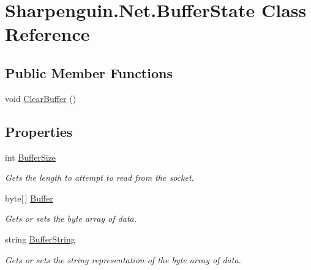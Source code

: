 \hypertarget{classSharpenguin_1_1Net_1_1BufferState}{\section{Sharpenguin.\-Net.\-Buffer\-State Class Reference}
\label{classSharpenguin_1_1Net_1_1BufferState}
}
\subsection*{Public Member Functions}
\begin{DoxyCompactItemize}
\item 
void \hyperlink{classSharpenguin_1_1Net_1_1BufferState_a73443f3d9519e6fb369c71ee6952f758}{Clear\-Buffer} ()
\end{DoxyCompactItemize}
\subsection*{Properties}
\begin{DoxyCompactItemize}
\item 
\hypertarget{classSharpenguin_1_1Net_1_1BufferState_a01424f789f95f2a2b6293cc88f76b59e}{int \hyperlink{classSharpenguin_1_1Net_1_1BufferState_a01424f789f95f2a2b6293cc88f76b59e}{Buffer\-Size}}\label{classSharpenguin_1_1Net_1_1BufferState_a01424f789f95f2a2b6293cc88f76b59e}

\begin{DoxyCompactList}\small\item\em Gets the length to attempt to read from the socket. \end{DoxyCompactList}\item 
\hypertarget{classSharpenguin_1_1Net_1_1BufferState_a9391f33e6980927dd58dc636beb9998a}{byte\mbox{[}$\,$\mbox{]} \hyperlink{classSharpenguin_1_1Net_1_1BufferState_a9391f33e6980927dd58dc636beb9998a}{Buffer}}\label{classSharpenguin_1_1Net_1_1BufferState_a9391f33e6980927dd58dc636beb9998a}

\begin{DoxyCompactList}\small\item\em Gets or sets the byte array of data. \end{DoxyCompactList}\item 
\hypertarget{classSharpenguin_1_1Net_1_1BufferState_a12b394506b5b5dc4821535e52038210c}{string \hyperlink{classSharpenguin_1_1Net_1_1BufferState_a12b394506b5b5dc4821535e52038210c}{Buffer\-String}}\label{classSharpenguin_1_1Net_1_1BufferState_a12b394506b5b5dc4821535e52038210c}

\begin{DoxyCompactList}\small\item\em Gets or sets the string representation of the byte array of data. \end{DoxyCompactList}\end{DoxyCompactItemize}


